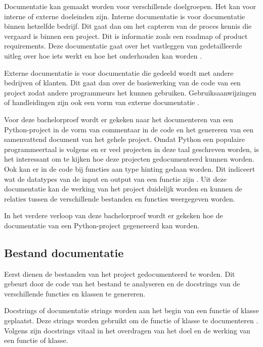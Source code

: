 Documentatie kan gemaakt worden voor verschillende doelgroepen. Het kan voor interne of externe doeleinden zijn.
Interne documentatie is voor documentatie binnen hetzelfde bedrijf.
Dit gaat dan om het capteren van de proces kennis die vergaard is binnen een project. Dit is informatie zoals een roadmap of product requirements. 
Deze documentatie gaat over het vastleggen van gedetaïlleerde uitleg over hoe iets werkt en hoe het onderhouden kan worden \autocite{swimm.io2024}.

Externe documentatie is voor documentatie die gedeeld wordt met andere bedrijven of klanten. 
Dit gaat dan over de basiswerking van de code van een project zodat andere programmeurs het kunnen gebruiken.
Gebruiksaanwijzingen of handleidingen zijn ook een vorm van externe documentatie \autocite{swimm.io2024}.

Voor deze bachelorproef wordt er gekeken naar het documenteren van een Python-project in de vorm van commentaar in de code en het genereren van een samenvattend document van het gehele project.
Omdat Python een populaire programmeertaal is volgens \textcite{TIOBE2024} en er veel projecten in deze taal geschreven worden, is het interessant om te kijken hoe deze projecten gedocumenteerd kunnen worden.
Ook kan er in de code bij functies aan type hinting gedaan worden. Dit indiceert wat de datatypes van de input en output van een functie zijn \autocite{Bailey2024}.
Uit deze documentatie kan de werking van het project duidelijk worden en kunnen de relaties tussen de verschillende bestanden en functies weergegeven worden.

In het verdere verloop van deze bachelorproef wordt er gekeken hoe de documentatie van een Python-project gegenereerd kan worden.

\subsection{Bestand documentatie}
\label{sec:bestand-documentatie}
Eerst dienen de bestanden van het project gedocumenteerd te worden.
Dit gebeurt door de code van het bestand te analyseren en de docstrings van de verschillende functies en klassen te genereren.

Docstrings of documentatie strings worden aan het begin van een functie of klasse geplaatst.
Deze strings worden gebruikt om de functie of klasse te documenteren \autocite{GeeksforGeeks2023}.
Volgens \textcite{GeeksforGeeks2023} zijn docstrings vitaal in het overdragen van het doel en de werking van een functie of klasse.

